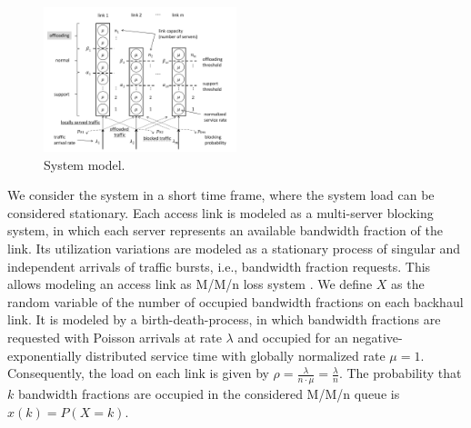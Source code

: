 \begin{figure}[tb]
	\centering
 	\includegraphics[width=0.5\textwidth]{aggregation/performance_model/figures/model_m}
  	\caption{System model.}
  	\label{fig:sysmodel}
\end{figure}


We consider the system in a short time frame, where the system load can be considered stationary.
Each access link is modeled as a multi-server blocking system, in which each server represents an available bandwidth fraction of the link.
Its utilization variations are modeled as a stationary process of singular and independent arrivals of traffic bursts, i.e., bandwidth fraction requests. This allows modeling an access link as M/M/n loss system \cite{kleinrock1975queuing}. We define $X$ as the random variable of the number of occupied bandwidth fractions on each backhaul link. It is modeled by a birth-death-process, in which bandwidth fractions are requested with Poisson arrivals at rate $\lambda$ and occupied for an negative-exponentially distributed service time with globally normalized rate $\mu=1$. Consequently, the load on each link is given by $\rho=\frac{\lambda}{n\cdot \mu}=\frac{\lambda}{n}$. The probability that $k$ bandwidth fractions are occupied in the considered M/M/n queue is $x(k)=P(X=k)$.

